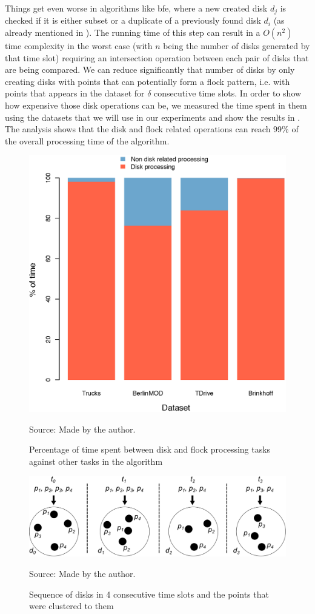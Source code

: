 Things get even worse in algorithms like \ac{bfe}, where a new created disk $d_j$ is checked if it is either subset or a
duplicate of a previously found disk $d_i$ (as already mentioned in ). The running time of
this step can result in a $O(n^2)$ time complexity in the worst case (with $n$ being the number of disks generated by
that time slot) requiring an intersection operation between each pair of disks that are being compared. We can reduce
significantly that number of disks by only creating disks with points that can potentially form a flock pattern, i.e.
with points that appears in the dataset for $\delta$ consecutive time slots. In order to show how expensive those disk
operations can be, we measured the time spent in them using the datasets that we will use in our experiments and show
the results in . The analysis shows that the disk and flock related operations can reach
99\% of the overall processing time of the algorithm.

\begin{figure}[h!]
    \centering
    \caption{Percentage of time spent between disk and flock processing tasks against other tasks in the algorithm}
    \centerline{\includegraphics[width=0.7\linewidth]{images/timeConsumption.eps}}
    \footnotesize{Source: Made by the author.}
    \label{fig:time_consumption}
\end{figure}

\begin{figure}[h!]
    \centering
    \caption{Sequence of disks in 4 consecutive time slots and the points that were clustered to them}
    \centerline{\includegraphics[width=\linewidth]{images/disks.eps}}
    \footnotesize{Source: Made by the author.}
    \label{fig:disks}
\end{figure}

